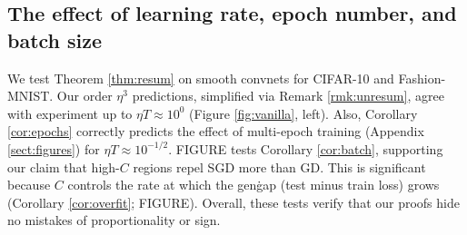 \documentclass{article}
\theoremstyle{plain}
\theoremstyle{definition}
\begin{document}
    \subsection{The effect of learning rate, epoch number, and batch size}
        We test Theorem \ref{thm:resum}  on smooth convnets for CIFAR-10 and
        Fashion-MNIST.  Our order $\eta^3$ predictions, simplified via Remark
        \ref{rmk:unresum}, agree with experiment up to $\eta T \approx 10^0$
        (Figure \ref{fig:vanilla}, left).  Also, Corollary \ref{cor:epochs}
        correctly predicts the effect of multi-epoch training (Appendix
        \ref{sect:figures}) for $\eta T \approx 10^{-1/2}$.
        {\color{red} FIGURE} tests Corollary \ref{cor:batch}, supporting our
        claim that high-$C$ regions repel SGD more than GD.  This is
        significant because $C$ controls the rate at which the gen\. gap (test
        minus train loss) grows (Corollary \ref{cor:overfit}; {\color{red}
        FIGURE}).
        Overall, these tests verify
        that our proofs hide no mistakes of proportionality or sign.  
\end{document}

